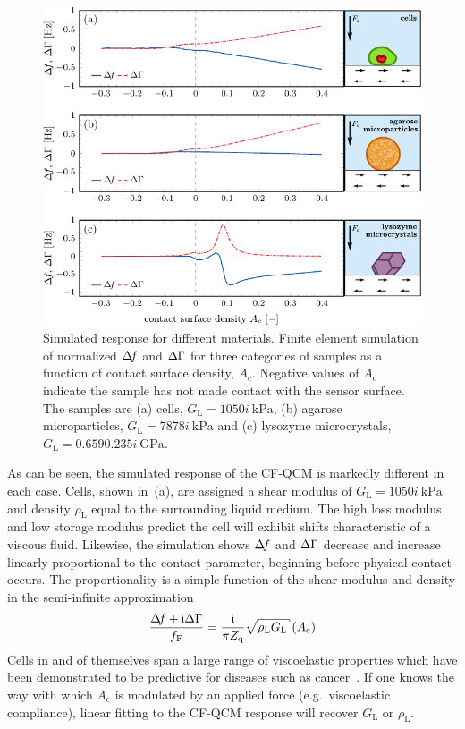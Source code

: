 \begin{figure}[ht]
  \centering
  \includegraphics{qcm/figures/multisweep.pdf}
  \caption{Simulated response for different materials.  Finite element simulation of normalized $\Delta\!f$ and $\Delta\Gamma$ for three
    categories of samples as a function of contact surface density,
    $A_\mathrm{c}$.
    Negative values of $A_\mathrm{c}$ indicate the sample has not made contact with the sensor
    surface.
    The samples are (a) cells, $G_\mathrm{L}=\SI{10+50i}{\kilo\pascal}$, (b)
    agarose microparticles, $G_\mathrm{L}=\SI{78+78i}{\kilo\pascal}$ and (c) lysozyme
    microcrystals, $G_\mathrm{L}=\SI{0.659+0.235i}{\giga\pascal}$.  }
  \label{fig:multisweep}
\end{figure}

As can be seen, the simulated response of the CF-QCM is markedly different
in each case. Cells, shown in \,(a), are assigned a
shear modulus of
$G_\mathrm{L}=\SI{10+50i}{\kilo\pascal}$~\cite{li2008thickness}~\cite{mahaffy2004quantitative} and density
$\rho_\mathrm{L}$ equal to the surrounding liquid medium.  The high loss
modulus and low storage modulus predict the cell will exhibit shifts
characteristic of a viscous fluid.  Likewise, the simulation shows $\Delta\!f$
and $\Delta\Gamma$ decrease and increase linearly proportional to the contact
parameter, beginning before physical contact occurs.  The proportionality
is a simple function of the shear modulus and density in the
semi-infinite approximation~\cite{flanigan2000contact}~\cite{kanazawa1985frequency}
\begin{equation}
  \frac{\df+\mi\dg}{f_\mathrm{F}}=\frac{\mi}{\pi Z_\mathrm{q}}\sqrt{\rho_\mathrm{L} G_\mathrm{L}}
  \left(A_\mathrm{c}\right)
\end{equation}
Cells in and of
themselves span a large range of viscoelastic properties which have been
demonstrated to be predictive for diseases such as
cancer~\cite{rebelo2013comparison}.  If one knows the way with which
$A_\mathrm{c}$ is modulated by an applied force (e.g.\ viscoelastic
compliance), linear fitting to
the CF-QCM response will recover $G_\mathrm{L}$ or $\rho_\mathrm{L}$.

